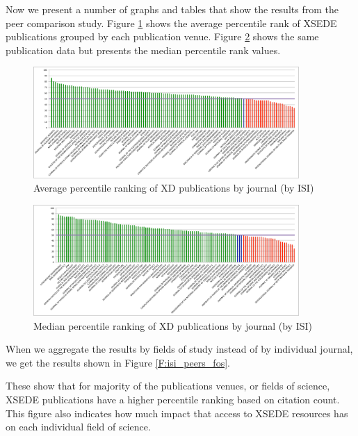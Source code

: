 \documentclass{sig-alternate}
\begin{document}
Now we present a number of graphs and tables that show the results
from the peer comparison study. Figure \ref{F:isi_peers_byj_mean}
shows the average percentile rank of XSEDE publications grouped by
each publication venue. Figure \ref{F:isi_peers_byj_median} shows the
same publication data but presents the median percentile rank values.

\begin{figure}[htb!]
  \centering
    \includegraphics[width=0.9\textwidth]{images/isi_peers_byj_mean.pdf}
    \caption{Average percentile ranking of XD publications by journal (by ISI)}
    \label{F:isi_peers_byj_mean}
\end{figure}

\begin{figure}[htb!]
  \centering
    \includegraphics[width=0.9\textwidth]{images/isi_peers_byj_median.pdf}
    \caption{Median percentile ranking of XD publications by journal (by ISI)}
    \label{F:isi_peers_byj_median}
\end{figure}

When we aggregate the results by fields of study instead of by
individual journal, we get the results shown in Figure
\ref{F:isi_peers_fos}.

These show that for majority of the publications venues, or fields of
science, XSEDE publications have a higher percentile ranking based on
citation count. This figure also indicates how much impact that access
to XSEDE resources has on each individual field of science.
\end{document}
